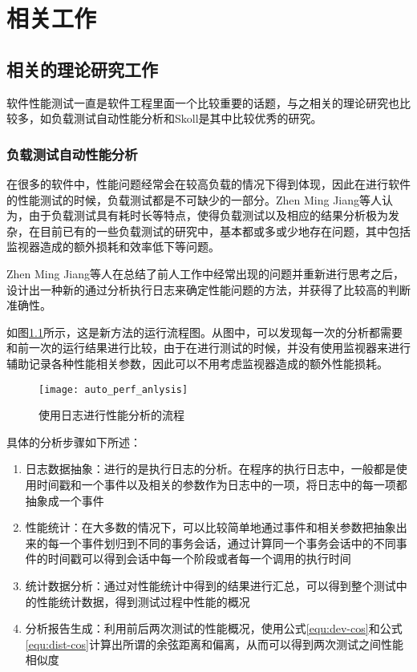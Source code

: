 
\chapter{相关工作}

\section{相关的理论研究工作}

软件性能测试一直是软件工程里面一个比较重要的话题，与之相关的理论研究也比较多，如负载测试自动性能分析\cite{Jiang:2010:AAL:1831708.1831726}和Skoll\cite{schmidt2001leveraging}是其中比较优秀的研究。

\subsection{负载测试自动性能分析}

在很多的软件中，性能问题经常会在较高负载的情况下得到体现，因此在进行软件的性能测试的时候，负载测试都是不可缺少的一部分。Zhen Ming Jiang等人认为，由于负载测试具有耗时长等特点，使得负载测试以及相应的结果分析极为发杂，在目前已有的一些负载测试的研究中，基本都或多或少地存在问题，其中包括监视器造成的额外损耗和效率低下等问题。

Zhen Ming Jiang等人在总结了前人工作中经常出现的问题并重新进行思考之后，设计出一种新的通过分析执行日志来确定性能问题的方法，并获得了比较高的判断准确性。

如图\ref{fig:auto_perf_anlysis}所示，这是新方法的运行流程图。从图中，可以发现每一次的分析都需要和前一次的运行结果进行比较，由于在进行测试的时候，并没有使用监视器来进行辅助记录各种性能相关参数，因此可以不用考虑监视器造成的额外性能损耗。


\begin{figure}[H]
\centering
\texttt{[image: auto\_perf\_anlysis]}
\caption{使用日志进行性能分析的流程\cite{Jiang:2010:AAL:1831708.1831726}}
\label{fig:auto_perf_anlysis}
\end{figure}


具体的分析步骤如下所述：

\begin{enumerate}
\item 日志数据抽象：进行的是执行日志的分析。在程序的执行日志中，一般都是使用时间戳和一个事件以及相关的参数作为日志中的一项，将日志中的每一项都抽象成一个事件
\item 性能统计：在大多数的情况下，可以比较简单地通过事件和相关参数把抽象出来的每一个事件划归到不同的事务会话，通过计算同一个事务会话中的不同事件的时间戳可以得到会话中每一个阶段或者每一个调用的执行时间
\item 统计数据分析：通过对性能统计中得到的结果进行汇总，可以得到整个测试中的性能统计数据，得到测试过程中性能的概况
\item 分析报告生成：利用前后两次测试的性能概况，使用公式\ref{equ:dev-cos}和公式\ref{equ:dist-cos}计算出所谓的余弦距离和偏离，从而可以得到两次测试之间性能相似度
\end{enumerate}

